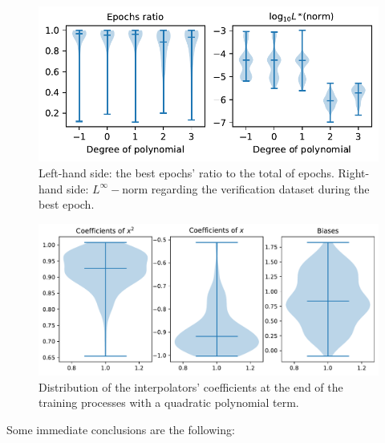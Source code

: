 \documentclass[12pt]{report} %
\begin{document}
\begin{figure}[ht]
  \includegraphics[width=.75\textwidth]{imagenes/experiments/1d/ode/violins.pdf}
  \caption{Left-hand side: the best epochs' ratio to the total of epochs. Right-hand side: $L^\infty-$norm
    regarding the verification dataset during the best epoch.}
  \label{fig:ode-1d-violins}
\end{figure}

\begin{figure}[h]
  \includegraphics[width=.85\textwidth]{imagenes/experiments/1d/ode/approximation_of_actual_solution}
  \caption{Distribution of the interpolators' coefficients at the end of the training processes with a quadratic polynomial term.}
  \label{fig:tr15-c5-quadratic-ode-1d-coefs}
\end{figure}


Some immediate conclusions are the following:
\end{document}
